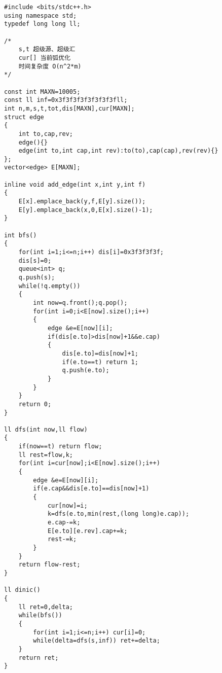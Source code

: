 \begin{lstlisting}
#include <bits/stdc++.h>
using namespace std;
typedef long long ll;

/*
    s,t 超级源、超级汇
    cur[] 当前弧优化
    时间复杂度 O(n^2*m)
*/

const int MAXN=10005;
const ll inf=0x3f3f3f3f3f3f3f3fll;
int n,m,s,t,tot,dis[MAXN],cur[MAXN];
struct edge
{
    int to,cap,rev;
    edge(){}
    edge(int to,int cap,int rev):to(to),cap(cap),rev(rev){}
};
vector<edge> E[MAXN];

inline void add_edge(int x,int y,int f)
{
    E[x].emplace_back(y,f,E[y].size());
    E[y].emplace_back(x,0,E[x].size()-1);
}

int bfs()
{
    for(int i=1;i<=n;i++) dis[i]=0x3f3f3f3f;
    dis[s]=0;
    queue<int> q;
    q.push(s);
    while(!q.empty())
    {
        int now=q.front();q.pop();
        for(int i=0;i<E[now].size();i++)
        {
            edge &e=E[now][i];
            if(dis[e.to]>dis[now]+1&&e.cap)
            {
                dis[e.to]=dis[now]+1;
                if(e.to==t) return 1;
                q.push(e.to);
            }
        }
    }
    return 0;
}

ll dfs(int now,ll flow)
{
    if(now==t) return flow;
    ll rest=flow,k;
    for(int i=cur[now];i<E[now].size();i++)
    {
        edge &e=E[now][i];
        if(e.cap&&dis[e.to]==dis[now]+1)
        {
            cur[now]=i;
            k=dfs(e.to,min(rest,(long long)e.cap));
            e.cap-=k;
            E[e.to][e.rev].cap+=k;
            rest-=k;
        }
    }
    return flow-rest;
}

ll dinic()
{
    ll ret=0,delta;
    while(bfs())
    {
        for(int i=1;i<=n;i++) cur[i]=0;
        while(delta=dfs(s,inf)) ret+=delta;
    }
    return ret;
}
\end{lstlisting}